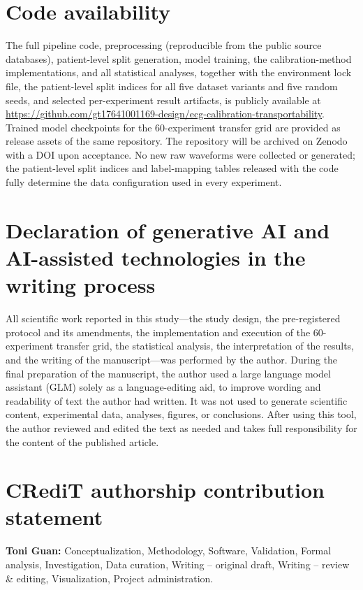 \documentclass[review,12pt,nonatbib]{elsarticle}
\begin{document}
\section*{Code availability}
The full pipeline code, preprocessing (reproducible from the
public source databases), patient-level split generation, model
training, the calibration-method implementations, and all statistical
analyses, together with the environment lock file, the patient-level
split indices for all five dataset variants and five random seeds, and
selected per-experiment result artifacts, is publicly available at
\url{https://github.com/gt17641001169-design/ecg-calibration-transportability}.
Trained model checkpoints for the 60-experiment transfer grid are
provided as release assets of the same repository. The repository will
be archived on Zenodo with a DOI upon acceptance. No new raw
waveforms were collected or generated; the patient-level split
indices and label-mapping tables released with the code fully
determine the data configuration used in every experiment.

\section*{Declaration of generative AI and AI-assisted technologies in the writing process}
All scientific work reported in this study---the study design, the
pre-registered protocol and its amendments, the implementation and
execution of the 60-experiment transfer grid, the statistical
analysis, the interpretation of the results, and the writing of the
manuscript---was performed by the author. During the final preparation
of the manuscript, the author used a large language model assistant
(GLM) solely as a language-editing aid, to improve wording and
readability of text the author had written. It was not used to
generate scientific content, experimental data, analyses, figures, or
conclusions. After using this tool, the author reviewed and edited the
text as needed and takes full responsibility for the content of the
published article.

\section*{CRediT authorship contribution statement}
\textbf{Toni Guan:} Conceptualization, Methodology, Software, Validation,
Formal analysis, Investigation, Data curation, Writing -- original draft,
Writing -- review \& editing, Visualization, Project administration.
\end{document}

